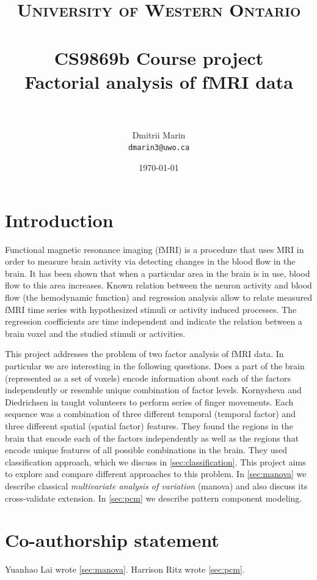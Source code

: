 \documentclass[paper=a4,fontsize=12pt]{scrartcl}
\title{	
\normalfont \normalsize 
\textsc{University of Western Ontario} \\ [25pt] %
\horrule{0.5pt} \\[0.4cm] %
\Large CS9869b Course project\\ \huge Factorial analysis of fMRI data  \\ %
\horrule{2pt} \\[0.5cm] %
}
\author{Dmitrii Marin \\ \small\tt dmarin3@uwo.ca} %
\date{\normalsize\today} %
\numberwithin{equation}{section} %
\numberwithin{figure}{section} %
\numberwithin{table}{section} %
\begin{document}
\maketitle %

\section*{Introduction}

Functional magnetic resonance imaging (fMRI) is a procedure that uses MRI in order to measure brain activity via detecting changes in the blood flow in the brain. It has been shown that when a particular area in the brain is in use, blood flow to this area increases\cite{ogawa1990brain,shmuel2002sustained}. Known relation between the neuron activity and blood flow (the hemodynamic function) and regression analysis allow to relate measured fMRI time series with hypothesized stimuli or activity induced processes\cite{huettel2004functional}. The regression coefficients are time independent and indicate the relation between a brain voxel and the studied stimuli or activities. 

This project addresses the problem of two factor analysis of fMRI data. In particular we are interesting in the following questions. Does a part of the brain (represented as a set of voxels) encode information about each of the factors independently or  resemble unique combination of factor levels. Kornysheva and Diedrichsen in \cite{Kornysheva2014} taught volunteers to perform series of finger movements. Each sequence was a combination of three different temporal (temporal factor) and three different spatial (spatial factor) features. They found the regions in the brain that encode each of the factors independently as well as the regions that encode unique features of all possible combinations in the brain. They used classification approach, which we discuss in \autoref{sec:classification}. This project aims to explore and compare different approaches to this problem. In \autoref{sec:manova} we describe classical \emph{multivariate analysis of variation} (manova) and also discuss its cross-validate extension. In \autoref{sec:pcm} we describe pattern component modeling.

\section*{Co-authorship statement}
Yuanhao Lai wrote \autoref{sec:manova}. Harrison Ritz wrote \autoref{sec:pcm}. 
\end{document}
